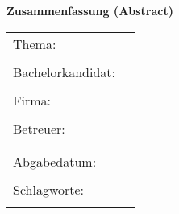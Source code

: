 \begin{center}
{\Large \textbf{Zusammenfassung (Abstract)}}
\end{center}

\bigskip

\begin{center}
	\begin{tabular}{p{4cm}p{9cm}}
		Thema: & \thema \\
		 & \\
		Bachelorkandidat: & \autor \\
		 & \\
		Firma: & \firma \\
		 & \\
		Betreuer: & \prueferA  \\[.5ex]
		 &  \prueferB \\
		 & \\
		Abgabedatum: & \abgabedatum \\
		 & \\
		Schlagworte: & \schlagworte \\
		 & \\
	\end{tabular}
\end{center}

\bigskip

\noindent
\zusammenfassung
